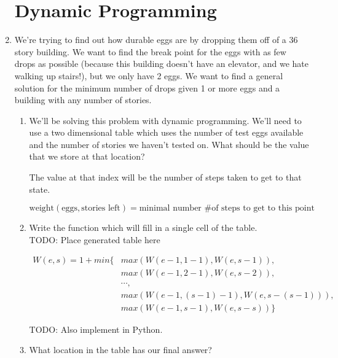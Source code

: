\documentclass[11pt]{article}
\newenvironment{answer}{\large\lstset{basicstyle=\large}\color{white}}{}
\newenvironment{answer}{\large\lstset{basicstyle=\large}\color{red}}{}
\begin{document}
\begin{enumerate}
\section*{Dynamic Programming}

\item We're trying to find out how durable eggs are by dropping them off of a
      36 story building. We want to find the break point for the eggs with as
      few drops as possible (because this building doesn't have an elevator,
      and we hate walking up stairs!), but we only have 2 eggs. We want to
      find a general solution for the minimum number of drops given 1 or more
      eggs and a building with any number of stories.
      
    \begin{enumerate}
    \item We'll be solving this problem with dynamic programming. We'll need
          to use a two dimensional table which uses the number of test eggs
          available and the number of stories we haven't tested on. What
          should be the value that we store at that location?
          
        \begin{answer} The value at that index will be the number of steps
        taken to get to that state.

          \[\textrm{weight}( \textrm{eggs}, \textrm{stories left} ) =
          \textrm{minimal number \# of steps to get to this point}\]
        \end{answer}

    \item Write the function which will fill in a single cell of the table.
    {\\\Huge TODO: Place generated table here}

        \begin{answer}
        \begin{align*}
        W(e,s) = 1 + min\{ & max(W(e-1,1-1),W(e,s-1)),\\
                           & max(W(e-1,2-1),W(e,s-2)),\\
                           & \cdots,\\
                           & max(W(e-1,(s-1)-1),W(e,s-(s-1))),\\
                           & max(W(e-1,s-1),W(e,s-s))\}
        \end{align*}

        {\Huge TODO: Also implement in Python.}

        \end{answer}
    
    \item What location in the table has our final answer?

    \end{enumerate}

\end{enumerate}
\end{document}
